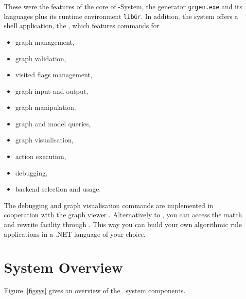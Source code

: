 \noindent These were the features of the core of \GrG-System, 
the generator \texttt{grgen.exe} and its languages plus its runtime environment \texttt{libGr}.
In addition, the \GrG system offers a shell application, the \GrShell, 
which features commands for
\begin{itemize}
\item graph management,
\item graph validation,
\item visited flags management,
\item graph input and output,
\item graph manipulation,
\item graph and model queries,
\item graph visualisation,
\item action execution,
\item debugging,
\item backend selection and usage.
\end{itemize}
The debugging and graph visualisation commands are implemented in cooperation with the graph viewer \yComp.
Alternatively to \GrShell, you can access the match and rewrite facility through \LibGr. 
This way you can build your own algorithmic rule applications in a .NET language of your choice. 


\section{System Overview}

Figure~\ref{figsys} gives an overview of the \GrG\ system components. 

